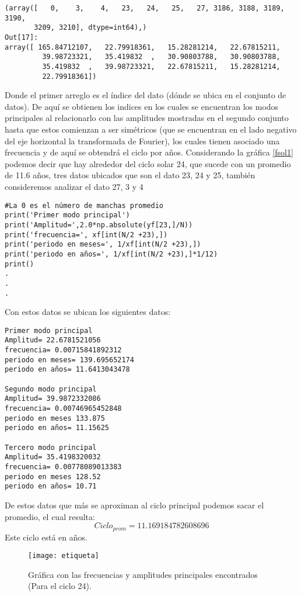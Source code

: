 \begin{verbatim}
(array([   0,    3,    4,   23,   24,   25,   27, 3186, 3188, 3189, 3190,
       3209, 3210], dtype=int64),)
Out[17]:
array([ 165.84712107,   22.79918361,   15.28281214,   22.67815211,
         39.98723321,   35.419832  ,   30.90803788,   30.90803788,
         35.419832  ,   39.98723321,   22.67815211,   15.28281214,
         22.79918361])
\end{verbatim}
Donde el primer arreglo es el índice del dato (dónde se ubica en el conjunto de datos). De aquí se obtienen los indices en los cuales se encuentran los modos principales al relacionarlo con las amplitudes mostradas en el segundo conjunto hasta que estos comienzan a ser simétricos (que se encuentran en el lado negativo del eje horizontal la transformada de Fourier), los cuales tienen asociado una frecuencia y de aquí se obtendrá el ciclo por años. Considerando la gráfica \ref{fsol1} podemos decir que hay alrededor del ciclo solar 24, que sucede con un promedio de 11.6 años, tres datos ubicados que son el dato 23, 24 y 25, también consideremos analizar el dato 27, 3 y 4

\begin{verbatim}
#La 0 es el número de manchas promedio
print('Primer modo principal')
print('Amplitud=',2.0*np.absolute(yf[23,]/N))
print('frecuencia=', xf[int(N/2 +23),])
print('periodo en meses=', 1/xf[int(N/2 +23),])
print('periodo en años=', 1/xf[int(N/2 +23),]*1/12)
print()
.
.
.
\end{verbatim}
Con estos datos se ubican los siguientes datos:
\begin{verbatim}
Primer modo principal
Amplitud= 22.6781521056
frecuencia= 0.00715841892312
periodo en meses= 139.695652174
periodo en años= 11.6413043478

Segundo modo principal
Amplitud= 39.9872332086
frecuencia= 0.00746965452848
periodo en meses 133.875
periodo en años= 11.15625

Tercero modo principal
Amplitud= 35.4198320032
frecuencia= 0.00778089013383
periodo en meses 128.52
periodo en años= 10.71
\end{verbatim}

De estos datos que más se aproximan al ciclo principal podemos sacar el promedio, el cual resulta:
$$Ciclo_{prom} = 11.169184782608696$$
Este ciclo está en años.
\begin{figure}
\centering
\texttt{[image: etiqueta]}
\caption{Gráfica con las frecuencias y amplitudes principales encontrados (Para el ciclo 24).}
\end{figure}

